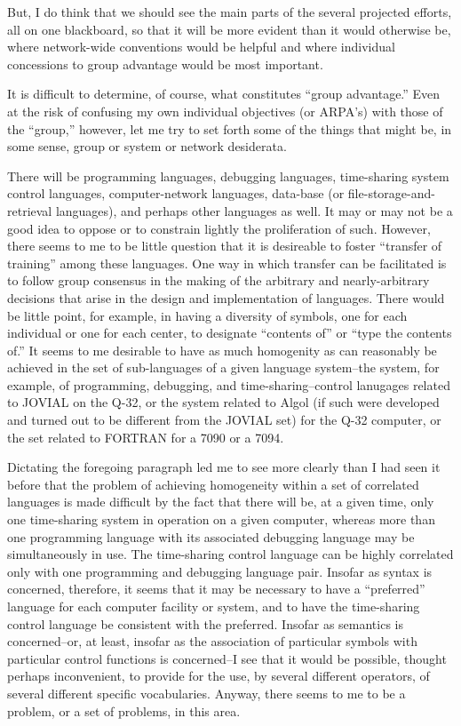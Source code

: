 \documentclass{article}
\begin{document}
But, I do think that we should see the main parts of the several projected efforts, all on one blackboard, so that it will be more evident than it would otherwise be, where network-wide conventions would be helpful and where individual concessions to group advantage would be most important.

It is difficult to determine, of course, what constitutes ``group advantage.'' Even at the risk of confusing my own individual objectives (or ARPA's) with those of the ``group,'' however, let me try to set forth some of the things that might be, in some sense, group or system or network desiderata.

There will be programming languages, debugging languages, time-sharing system control languages, computer-network languages, data-base (or file-storage-and-retrieval languages), and perhaps other languages as well. It may or may not be a good idea to oppose or to constrain lightly the proliferation of such. However, there seems to me to be little question that it is desireable to foster ``transfer of training'' among these languages. One way in which transfer can be facilitated is to follow group consensus in the making of the arbitrary and nearly-arbitrary decisions that arise in the design and implementation of languages. There would be little point, for example, in having a diversity of symbols, one for each individual or one for each center, to designate ``contents of'' or ``type the contents of.'' It seems to me desirable to have as much homogenity as can reasonably be achieved in the set of sub-languages of a given language system--the system, for example, of programming, debugging, and time-sharing--control lanugages related to JOVIAL on the Q-32, or the system related to Algol (if such were developed and turned out to be different from the JOVIAL set) for the Q-32 computer, or the set related to FORTRAN for a 7090 or a 7094.

Dictating the foregoing paragraph led me to see more clearly than I had seen it before that the problem of achieving homogeneity within a set of correlated languages is made difficult by the fact that there will be, at a given time, only one time-sharing system in operation on a given computer, whereas more than one programming language with its associated debugging language may be simultaneously in use. The time-sharing control language can be highly correlated only with one programming and debugging language pair. Insofar as syntax is concerned, therefore, it seems that it may be necessary to have a ``preferred'' language for each computer facility or system, and to have the time-sharing control language be consistent with the preferred. Insofar as semantics is concerned--or, at least, insofar as the association of particular symbols with particular control functions is concerned--I see that it would be possible, thought perhaps inconvenient, to provide for the use, by several different operators, of several different specific vocabularies. Anyway, there seems to me to be a problem, or a set of problems, in this area.
\end{document}
